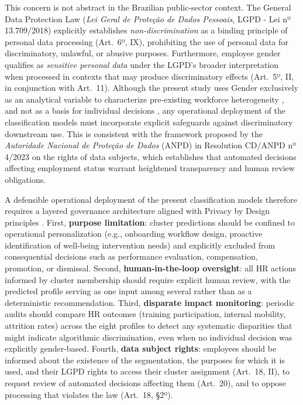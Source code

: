 \documentclass[alpha-refs,english]{RBCA_v3.0}
\begin{document}
This concern is not abstract in the Brazilian public-sector context. 
The General Data Protection Law (\textit{Lei Geral de Proteção de 
Dados Pessoais}, LGPD - Lei nº 13.709/2018) explicitly establishes 
\textit{non-discrimination} as a binding principle of personal data 
processing (Art.~6º, IX), prohibiting the use of personal data for 
discriminatory, unlawful, or abusive purposes. Furthermore, 
employee gender qualifies as \textit{sensitive personal data} under 
the LGPD's broader interpretation when processed in contexts that 
may produce discriminatory effects (Art.~5º, II, in conjunction with 
Art.~11). Although the present study uses Gender exclusively as an 
analytical variable to characterize pre-existing workforce 
heterogeneity , and not as a basis for individual decisions , 
any operational deployment of the classification models must 
incorporate explicit safeguards against discriminatory downstream 
use. This is consistent with the framework proposed by the 
\textit{Autoridade Nacional de Proteção de Dados} (ANPD) in 
Resolution CD/ANPD nº 4/2023 on the rights of data subjects, which 
establishes that automated decisions affecting employment status 
warrant heightened transparency and human review obligations.

A defensible operational deployment of the present classification 
models therefore requires a layered governance architecture aligned 
with Privacy by Design principles \citep{Cavoukian2009}. First, 
\textbf{purpose limitation}: cluster predictions should be confined 
to operational personalization (e.g., onboarding workflow design, 
proactive identification of well-being intervention needs) and 
explicitly excluded from consequential decisions such as 
performance evaluation, compensation, promotion, or dismissal. 
Second, \textbf{human-in-the-loop oversight}: all HR actions 
informed by cluster membership should require explicit human 
review, with the predicted profile serving as one input among 
several rather than as a deterministic recommendation. Third, 
\textbf{disparate impact monitoring}: periodic audits should 
compare HR outcomes (training participation, internal mobility, 
attrition rates) across the eight profiles to detect any 
systematic disparities that might indicate algorithmic 
discrimination, even when no individual decision was explicitly 
gender-based. Fourth, \textbf{data subject rights}: employees 
should be informed about the existence of the segmentation, the 
purposes for which it is used, and their LGPD rights to access 
their cluster assignment (Art.~18, II), to request review of 
automated decisions affecting them (Art.~20), and to oppose 
processing that violates the law (Art.~18, §2º).
\end{document}
